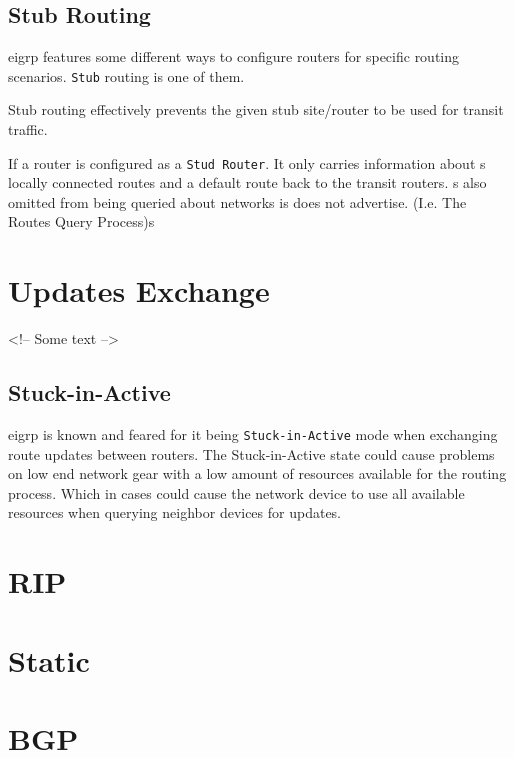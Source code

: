 \subsection{Stub Routing}

\gls{eigrp} features some different ways to configure routers for specific routing scenarios. \texttt{Stub} routing is one of them.

Stub routing effectively prevents the given stub site/router to be used for transit traffic.

If a router is configured as a \texttt{Stud Router}. It only carries information about s locally connected routes and a default route back to the transit routers. s also omitted from being queried about networks is does not advertise. {\small (I.e. The Routes Query Process)}s

\section{Updates Exchange}

<!-- Some text -->

\subsection[SIA]{Stuck-in-Active}
\gls{eigrp} is known and feared for it being \texttt{Stuck-in-Active} mode when exchanging route updates between routers. The Stuck-in-Active state could cause problems on low end network gear with a low amount of resources available for the routing process. Which in cases could cause the network device to use all available resources when querying neighbor devices for updates.


\newpage

\section{RIP}

\newpage

\section{Static}

\newpage

\section{BGP}

